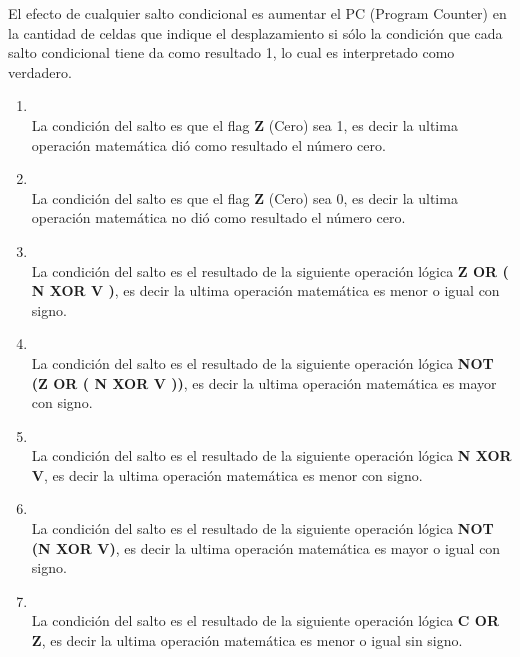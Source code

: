 El efecto de cualquier salto condicional es aumentar el PC (Program Counter) en la cantidad de celdas que indique el desplazamiento si sólo la condición que cada salto condicional tiene da como resultado 1, lo cual es interpretado como verdadero.

\begin{enumerate}
\item  {}\\
La condición del salto es que el flag \textbf{Z} (Cero) sea 1, es decir la ultima operación matemática dió como resultado el número cero.

\item  {}\\
La condición del salto es que el flag \textbf{Z} (Cero) sea 0, es decir la ultima operación matemática no dió como resultado el número cero.

\item  {}\\
La condición del salto es el resultado de la siguiente operación lógica \textbf{Z OR ( N XOR V )}, es decir la ultima operación matemática es menor o igual con signo.

\item  {}\\
La condición del salto es el resultado de la siguiente operación lógica \textbf{NOT (Z OR ( N XOR V ))}, es decir la ultima operación matemática es mayor con signo.

\item  {}\\
La condición del salto es el resultado de la siguiente operación lógica \textbf{N XOR V}, es decir la ultima operación matemática es menor con signo.

\item  {}\\
La condición del salto es el resultado de la siguiente operación lógica \textbf{NOT (N XOR V)}, es decir la ultima operación matemática es mayor o igual con signo.

\item  {}\\
La condición del salto es el resultado de la siguiente operación lógica \textbf{C OR Z}, es decir la ultima operación matemática es menor o igual sin signo.


\end{enumerate}
